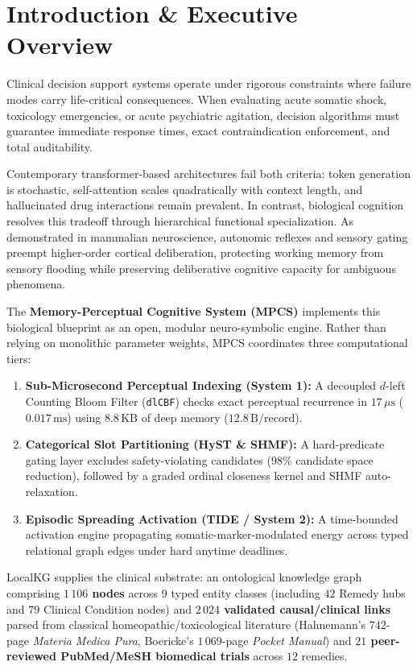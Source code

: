\documentclass[10pt,twocolumn,letterpaper]{article}
\begin{document}
\section{Introduction \& Executive Overview}
Clinical decision support systems operate under rigorous constraints where failure modes carry life-critical consequences. When evaluating acute somatic shock, toxicology emergencies, or acute psychiatric agitation, decision algorithms must guarantee immediate response times, exact contraindication enforcement, and total auditability.

Contemporary transformer-based architectures fail both criteria: token generation is stochastic, self-attention scales quadratically with context length, and hallucinated drug interactions remain prevalent. In contrast, biological cognition resolves this tradeoff through hierarchical functional specialization. As demonstrated in mammalian neuroscience, autonomic reflexes and sensory gating preempt higher-order cortical deliberation, protecting working memory from sensory flooding while preserving deliberative cognitive capacity for ambiguous phenomena.

The \textbf{Memory-Perceptual Cognitive System (MPCS)} implements this biological blueprint as an open, modular neuro-symbolic engine. Rather than relying on monolithic parameter weights, MPCS coordinates three computational tiers:
\begin{enumerate}[label=\alph*)]
  \item \textbf{Sub-Microsecond Perceptual Indexing (System 1):} A decoupled $d$-left Counting Bloom Filter (\texttt{dlCBF}) checks exact perceptual recurrence in $17\,\mu\text{s}$ ($0.017\,\text{ms}$) using $8.8\,\text{KB}$ of deep memory ($12.8\,\text{B/record}$).
  \item \textbf{Categorical Slot Partitioning (HyST \& SHMF):} A hard-predicate gating layer excludes safety-violating candidates ($98\%$ candidate space reduction), followed by a graded ordinal closeness kernel and SHMF auto-relaxation.
  \item \textbf{Episodic Spreading Activation (TIDE / System 2):} A time-bounded activation engine propagating somatic-marker-modulated energy across typed relational graph edges under hard anytime deadlines.
\end{enumerate}

LocalKG supplies the clinical substrate: an ontological knowledge graph comprising \textbf{$1\,106$ nodes} across 9 typed entity classes (including $42$ Remedy hubs and $79$ Clinical Condition nodes) and \textbf{$2\,024$ validated causal/clinical links} parsed from classical homeopathic/toxicological literature (Hahnemann's $742$-page \textit{Materia Medica Pura}, Boericke's $1\,069$-page \textit{Pocket Manual}) and \textbf{$21$ peer-reviewed PubMed/MeSH biomedical trials} across $12$ remedies.
\end{document}
